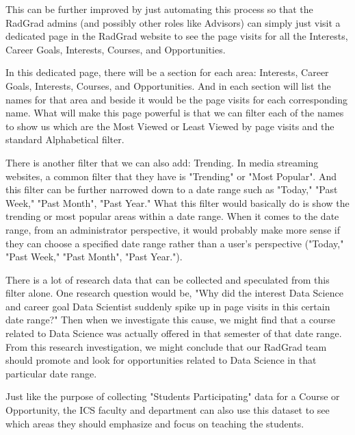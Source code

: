 \documentclass[english]{proposalnsf}
\begin{document}
  This can be further improved by just automating this process so that the RadGrad admins (and possibly other roles like Advisors) can simply just visit a dedicated page in the RadGrad website to see the page visits for all the Interests, Career Goals, Interests, Courses, and Opportunities.

  In this dedicated page, there will be a section for each area: Interests, Career Goals, Interests, Courses, and Opportunities.
  And in each section will list the names for that area and beside it would be the page visits for each corresponding name.
  What will make this page powerful is that we can filter each of the names to show us which are the Most Viewed or Least Viewed by page visits and the standard Alphabetical filter.

  There is another filter that we can also add: Trending.
  In media streaming websites, a common filter that they have is "Trending" or "Most Popular".
  And this filter can be further narrowed down to a date range such as "Today," "Past Week," "Past Month", "Past Year." What this filter would basically do is show the trending or most popular areas within a date range.
  When it comes to the date range, from an administrator perspective, it would probably make more sense if they can choose a specified date range rather than a user's perspective ("Today," "Past Week," "Past Month", "Past Year.").

  There is a lot of research data that can be collected and speculated from this filter alone.
  One research question would be, "Why did the interest Data Science and career goal Data Scientist suddenly spike up in page visits in this certain date range?" Then when we investigate this cause, we might find that a course related to Data Science was actually offered in that semester of that date range.
  From this research investigation, we might conclude that our RadGrad team should promote and look for opportunities related to Data Science in that particular date range.

  Just like the purpose of collecting "Students Participating" data for a Course or Opportunity, the ICS faculty and department can also use this dataset to see which areas they should emphasize and focus on teaching the students.
\end{document}
